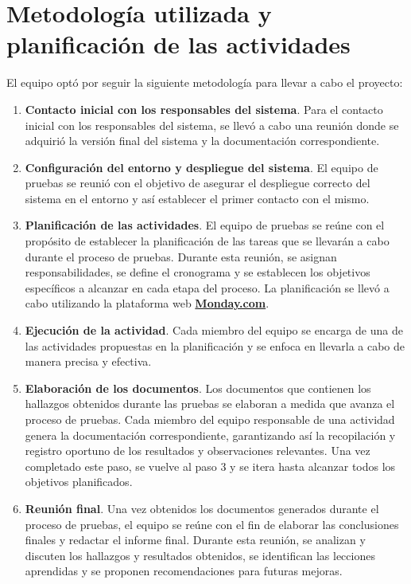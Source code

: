 \documentclass[10pt,times,twocolumn]{article}
\begin{document}
\section{Metodología utilizada y planificación de las actividades}

El equipo optó por seguir la siguiente metodología para llevar a cabo el proyecto:

\begin{enumerate}
	\item \textbf{Contacto inicial con los responsables del sistema}. Para el contacto inicial con los responsables del sistema, se llevó a cabo una reunión donde se adquirió la versión final del sistema y la documentación correspondiente.
	\item \textbf{Configuración del entorno y despliegue del sistema}. El equipo de pruebas se reunió con el objetivo de asegurar el despliegue correcto del sistema en el entorno y así establecer el primer contacto con el mismo.
	\item \textbf{Planificación de las actividades}. El equipo de pruebas se reúne con el propósito de establecer la planificación de las tareas que se llevarán a cabo durante el proceso de pruebas. Durante esta reunión, se asignan responsabilidades, se define el cronograma y se establecen los objetivos específicos a alcanzar en cada etapa del proceso. La planificación se llevó a cabo utilizando la plataforma web \href{https://monday.com}{\textbf{Monday.com}}.
	\item \textbf{Ejecución de la actividad}. Cada miembro del equipo se encarga de una de las actividades propuestas en la planificación y se enfoca en llevarla a cabo de manera precisa y efectiva.
	\item \textbf{Elaboración de los documentos}. Los documentos que contienen los hallazgos obtenidos durante las pruebas se elaboran a medida que avanza el proceso de pruebas. Cada miembro del equipo responsable de una actividad genera la documentación correspondiente, garantizando así la recopilación y registro oportuno de los resultados y observaciones relevantes. Una vez completado este paso, se vuelve al paso 3 y se itera hasta alcanzar todos los objetivos planificados.
	\item \textbf{Reunión final}. Una vez obtenidos los documentos generados durante el proceso de pruebas, el equipo se reúne con el fin de elaborar las conclusiones finales y redactar el informe final. Durante esta reunión, se analizan y discuten los hallazgos y resultados obtenidos, se identifican las lecciones aprendidas y se proponen recomendaciones para futuras mejoras.
\end{enumerate}
\end{document}
